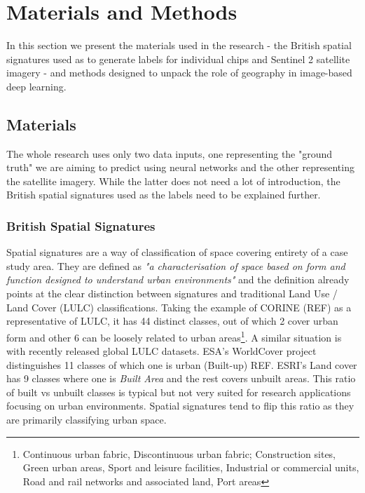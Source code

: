 \section{Materials and Methods}
\label{sec:matmet}

In this section we present the materials used in the research - the British spatial
signatures used as to generate labels for individual chips and Sentinel 2 satellite
imagery - and methods designed to unpack the role of geography in image-based deep
learning.

\subsection{Materials}

The whole research uses only two data inputs, one representing the "ground truth" we are
aiming to predict using neural networks and the other representing the satellite
imagery. While the latter does not need a lot of introduction, the British spatial
signatures used as the labels need to be explained further.

\subsubsection{British Spatial Signatures}

Spatial signatures are a way of classification of space covering entirety of a case
study area. They are defined as \textit{"a characterisation of space based on form and
function designed to understand urban environments"} \citep{dab_mf_2021a} and the
definition already points at the clear distinction between signatures and traditional
Land Use / Land Cover (LULC) classifications. Taking the example of CORINE (REF) as a
representative of LULC, it has 44 distinct classes, out of which 2 cover urban form and
other 6 can be loosely related to urban areas\footnote{Continuous urban fabric,
Discontinuous urban fabric; Construction sites, Green urban areas, Sport and leisure
facilities, Industrial or commercial units, Road and rail networks and associated land,
Port areas}. A similar situation is with recently released global LULC datasets. ESA's
WorldCover project distinguishes 11 classes of which one is urban (Built-up) REF. ESRI's
Land cover has 9 classes where one is \textit{Built Area} and the rest covers unbuilt
areas. This ratio of built vs unbuilt classes is typical but not very suited for
research applications focusing on urban environments. Spatial signatures tend to flip
this ratio as they are primarily classifying urban space.

